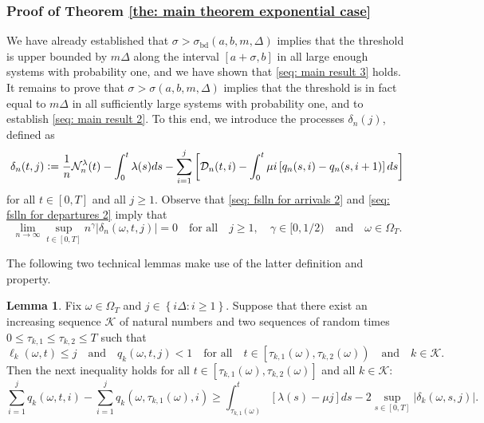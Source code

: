 \documentclass[a4paper, 12pt]{article}
\theoremstyle{definition}
\newtheorem{lemma}[theorem]{Lemma}
\newcommand{\set}[2]{\left\{#1 : #2\right\}}
\newcommand{\defeq}{\vcentcolon=}
\newcommand{\calD}{\mathcal{D}}
\newcommand{\calK}{\mathcal{K}}
\newcommand{\calN}{\mathcal{N}}
\newcommand{\bd}{\mathrm{bd}}
\begin{document}
\subsubsection{Proof of Theorem \ref{the: main theorem exponential case}}
\label{subsub: proof of main result exponential case}

We have already established that $\sigma > \sigma_\bd(a, b, m , \Delta)$ implies that the threshold is upper bounded by $m \Delta$ along the interval $[a + \sigma, b]$ in all large enough systems with probability one, and we have shown that \eqref{seq: main result 3} holds. It remains to prove that $\sigma > \sigma(a, b, m , \Delta)$ implies that the threshold is in fact equal to $m \Delta$ in all sufficiently large systems with probability one, and to establish \eqref{seq: main result 2}. To this end, we introduce the processes $\delta_n(j)$, defined as
\begin{equation}
	\label{eq: error process}
	\delta_n(t, j) \defeq \frac{1}{n}\calN_n^\lambda(t) - \int_0^t \lambda(s)ds - \sum_{i = 1}^{j} \left[\calD_n(t, i) - \int_0^t \mu i \left[q_n(s, i) - q_n(s, i + 1)\right]ds\right]  
\end{equation}
for all $t \in [0, T]$ and all $j \geq 1$. Observe that \eqref{seq: fslln for arrivals 2} and \eqref{seq: fslln for departures 2} imply that
\begin{equation}
	\label{eq: error process goes to zero}
	\lim_{n \to \infty} \sup_{t \in [0, T]} n^\gamma |\delta_n(\omega, t, j)| = 0 \quad \text{for all} \quad j \geq 1, \quad \gamma \in [0, 1 / 2) \quad \text{and} \quad \omega \in \Omega_T.
\end{equation}

The following two technical lemmas make use of the latter definition and property.

\begin{lemma}
	\label{lem: lemma 1 for main result}
	Fix $\omega \in \Omega_T$ and $j \in \set{i\Delta}{i \geq 1}$. Suppose that there exist an increasing sequence $\calK$ of natural numbers and two sequences of random times $0 \leq \tau_{k, 1} \leq \tau_{k, 2} \leq T$ such that
	\begin{equation*}
		\ell_k(\omega, t) \leq j \quad \text{and} \quad q_k(\omega, t, j) < 1 \quad \text{for all} \quad t \in \left[\tau_{k, 1}(\omega), \tau_{k, 2}(\omega)\right) \quad \text{and} \quad k \in \calK.
	\end{equation*}
	Then the next inequality holds for all $t \in \left[\tau_{k, 1}(\omega), \tau_{k, 2}(\omega)\right]$ and all $k \in \calK$:
	\begin{equation*}
		\sum_{i = 1}^j q_k(\omega, t, i) - \sum_{i = 1}^j q_k\left(\omega, \tau_{k, 1}(\omega), i\right) \geq \int_{\tau_{k, 1}(\omega)}^t \left[\lambda(s) - \mu j\right]ds - 2\sup_{s \in [0, T]} \left|\delta_k(\omega, s, j)\right|.
	\end{equation*}
\end{lemma}
\end{document}
